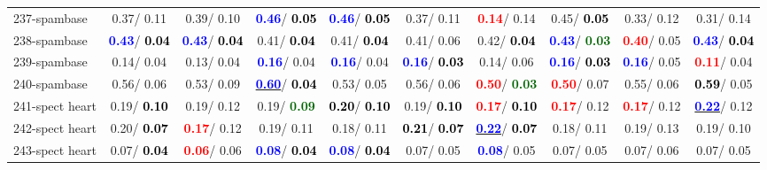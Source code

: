 \begin{table}[h]
\begin{center}
{\begin{tabular}{lc|c|c|c|c|c|c|c|c}
237-spambase &   0.37/  0.11 &   0.39/  0.10 & \textcolor{blue}{\textbf{  0.46}}/\textcolor{black}{\textbf{  0.05}} & \textcolor{blue}{\textbf{  0.46}}/\textcolor{black}{\textbf{  0.05}} &   0.37/  0.11 & \textcolor{red}{\textbf{  0.14}}/  0.14 &   0.45/\textcolor{black}{\textbf{  0.05}} &   0.33/  0.12 &   0.31/  0.14 \\
238-spambase & \textcolor{blue}{\textbf{  0.43}}/\textcolor{black}{\textbf{  0.04}} & \textcolor{blue}{\textbf{  0.43}}/\textcolor{black}{\textbf{  0.04}} &   0.41/\textcolor{black}{\textbf{  0.04}} &   0.41/\textcolor{black}{\textbf{  0.04}} &   0.41/  0.06 &   0.42/\textcolor{black}{\textbf{  0.04}} & \textcolor{blue}{\textbf{  0.43}}/\textcolor{darkgreen}{\textbf{  0.03}} & \textcolor{red}{\textbf{  0.40}}/  0.05 & \textcolor{blue}{\textbf{  0.43}}/\textcolor{black}{\textbf{  0.04}} \\ \hline
239-spambase &   0.14/  0.04 &   0.13/  0.04 & \textcolor{blue}{\textbf{  0.16}}/  0.04 & \textcolor{blue}{\textbf{  0.16}}/  0.04 & \textcolor{blue}{\textbf{  0.16}}/\textcolor{black}{\textbf{  0.03}} &   0.14/  0.06 & \textcolor{blue}{\textbf{  0.16}}/\textcolor{black}{\textbf{  0.03}} & \textcolor{blue}{\textbf{  0.16}}/  0.05 & \textcolor{red}{\textbf{  0.11}}/  0.04 \\
240-spambase &   0.56/  0.06 &   0.53/  0.09 & \underline{\textcolor{blue}{\textbf{  0.60}}}/\textcolor{black}{\textbf{  0.04}} &   0.53/  0.05 &   0.56/  0.06 & \textcolor{red}{\textbf{  0.50}}/\textcolor{darkgreen}{\textbf{  0.03}} & \textcolor{red}{\textbf{  0.50}}/  0.07 &   0.55/  0.06 & \textcolor{black}{\textbf{  0.59}}/  0.05 \\
241-spect heart &   0.19/\textcolor{black}{\textbf{  0.10}} &   0.19/  0.12 &   0.19/\textcolor{darkgreen}{\textbf{  0.09}} & \textcolor{black}{\textbf{  0.20}}/\textcolor{black}{\textbf{  0.10}} &   0.19/\textcolor{black}{\textbf{  0.10}} & \textcolor{red}{\textbf{  0.17}}/\textcolor{black}{\textbf{  0.10}} & \textcolor{red}{\textbf{  0.17}}/  0.12 & \textcolor{red}{\textbf{  0.17}}/  0.12 & \underline{\textcolor{blue}{\textbf{  0.22}}}/  0.12 \\
242-spect heart &   0.20/\textcolor{black}{\textbf{  0.07}} & \textcolor{red}{\textbf{  0.17}}/  0.12 &   0.19/  0.11 &   0.18/  0.11 & \textcolor{black}{\textbf{  0.21}}/\textcolor{black}{\textbf{  0.07}} & \underline{\textcolor{blue}{\textbf{  0.22}}}/\textcolor{black}{\textbf{  0.07}} &   0.18/  0.11 &   0.19/  0.13 &   0.19/  0.10 \\
243-spect heart &   0.07/\textcolor{black}{\textbf{  0.04}} & \textcolor{red}{\textbf{  0.06}}/  0.06 & \textcolor{blue}{\textbf{  0.08}}/\textcolor{black}{\textbf{  0.04}} & \textcolor{blue}{\textbf{  0.08}}/\textcolor{black}{\textbf{  0.04}} &   0.07/  0.05 & \textcolor{blue}{\textbf{  0.08}}/  0.05 &   0.07/  0.05 &   0.07/  0.06 &   0.07/  0.05 \\

\end{tabular}}
\end{center}
\end{table}

